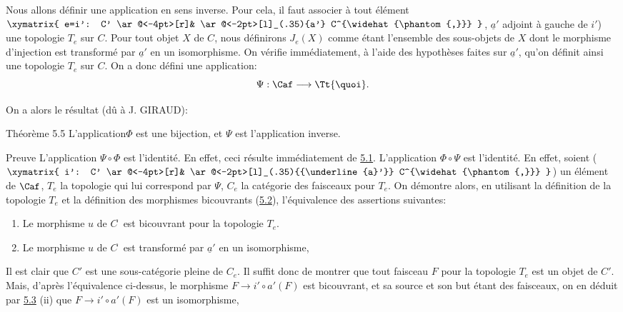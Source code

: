 Nous allons définir une application en sens inverse. Pour cela, il
faut associer à tout élément $\xymatrix{ e=i': C' \ar@<-4pt>[r]&
\ar@<-2pt>[l]_(.35){a'} C^{\widehat{\phantom{,}}} }$, $\underline{a}'$
adjoint à gauche de $i'$) une topologie $T_e$ sur $C$. Pour tout
objet $X$ de $C$, nous définirons $J_e(X)$ comme étant
l'ensemble des sous-objets de $X$ dont le morphisme d'injection est
transformé par $\underline{a}'$ en un isomorphisme. On vérifie
immédiatement, à l'aide des hypothèses faites sur $\underline{a}'$,
qu'on définit ainsi une topologie $T_e$ sur $C$. On a donc
défini une application:
$$
\Psi:\Caf\longrightarrow \Tt{\quoi}.
$$

On a alors le résultat (d\^u à J. GIRAUD):

\begin{enonce*}{Théorème 5.5}
L'application\pageoriginale $\Phi$ est une bijection, et $\Psi$ est
l'application inverse.
\end{enonce*}

\begin{enonce*}[remark]{Preuve}
L'application $\Psi\circ \Phi$ est l'identité. En effet, ceci
résulte immédiatement de \hyperref[II.prop5.1]{5.1}. L'application
$\Phi\circ \Psi$ est l'identité. En effet, soient ($\xymatrix{ i':
C' \ar@<-4pt>[r]& \ar@<-2pt>[l]_(.35){{\underline{a}'}}
C^{\widehat{\phantom{,}}} }$) un élément de $\Caf$, $T_e$ la
topologie qui lui correspond par $\Psi$, $C_e$ la catégorie des
faisceaux pour $T_e$. On démontre alors, en utilisant la
définition de la topologie $T_e$ et la définition des morphismes
bicouvrants (\hyperref[II.def5.2]{5.2}), l'équivalence des assertions
suivantes:
\begin{enumerate}
\renewcommand{\theenumi}{\roman{enumi}}
\renewcommand{\labelenumi}{\theenumi)}
\item Le morphisme $u$ de $C^{\widehat{\phantom{,}}}$ est bicouvrant
  pour la topologie $T_e$.

\item Le morphisme $u$ de $C^{\widehat{\phantom{,}}}$ est transformé
  par $\underline{a}'$ en un isomorphisme,
\end{enumerate}

Il est clair que $C'$ est une sous-catégorie pleine de $C_e$. Il
suffit donc de montrer que tout faisceau $F$ pour la topologie $T_e$
est un objet de $C'$. Mais, d'après l'équivalence ci-dessus, le
morphisme $F\rightarrow i'\circ a'(F)$ est bicouvrant, et sa source
et son but étant des faisceaux, on en déduit par
\hyperref[II.prop5.3]{5.3} (ii) que $F\rightarrow i'\circ a'(F)$ est un
isomorphisme, \cqfd
\end{enonce*}

